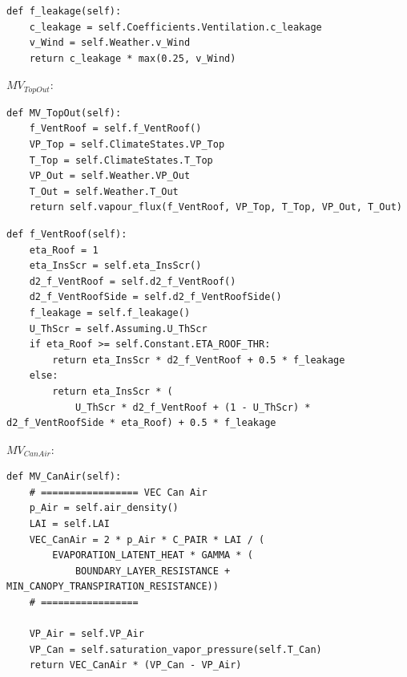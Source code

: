 \documentclass[a4paper]{article}
\numberwithin{equation}{section}
\begin{document}
\begin{mdframed}[leftline=false,rightline=false,backgroundcolor=magenta!10,nobreak=true]
  \begin{verbatim}
def f_leakage(self):
    c_leakage = self.Coefficients.Ventilation.c_leakage
    v_Wind = self.Weather.v_Wind
    return c_leakage * max(0.25, v_Wind)
  \end{verbatim}
\end{mdframed}

\( MV_{TopOut} \):
\begin{mdframed}[leftline=false,rightline=false,backgroundcolor=magenta!10,nobreak=true]
  \begin{verbatim}
def MV_TopOut(self):
    f_VentRoof = self.f_VentRoof()
    VP_Top = self.ClimateStates.VP_Top
    T_Top = self.ClimateStates.T_Top
    VP_Out = self.Weather.VP_Out
    T_Out = self.Weather.T_Out
    return self.vapour_flux(f_VentRoof, VP_Top, T_Top, VP_Out, T_Out)
  \end{verbatim}
\end{mdframed}
\begin{mdframed}[leftline=false,rightline=false,backgroundcolor=magenta!10,nobreak=true]
  \begin{verbatim}
def f_VentRoof(self):
    eta_Roof = 1
    eta_InsScr = self.eta_InsScr()
    d2_f_VentRoof = self.d2_f_VentRoof()
    d2_f_VentRoofSide = self.d2_f_VentRoofSide()
    f_leakage = self.f_leakage()
    U_ThScr = self.Assuming.U_ThScr
    if eta_Roof >= self.Constant.ETA_ROOF_THR:
        return eta_InsScr * d2_f_VentRoof + 0.5 * f_leakage
    else:
        return eta_InsScr * (
            U_ThScr * d2_f_VentRoof + (1 - U_ThScr) * d2_f_VentRoofSide * eta_Roof) + 0.5 * f_leakage
  \end{verbatim}
\end{mdframed}

\( MV_{CanAir} \):
\begin{mdframed}[leftline=false,rightline=false,backgroundcolor=magenta!10,nobreak=true]
  \begin{verbatim}
def MV_CanAir(self):
    # ================= VEC Can Air
    p_Air = self.air_density()
    LAI = self.LAI
    VEC_CanAir = 2 * p_Air * C_PAIR * LAI / (
        EVAPORATION_LATENT_HEAT * GAMMA * (
            BOUNDARY_LAYER_RESISTANCE + MIN_CANOPY_TRANSPIRATION_RESISTANCE))
    # =================

    VP_Air = self.VP_Air
    VP_Can = self.saturation_vapor_pressure(self.T_Can)
    return VEC_CanAir * (VP_Can - VP_Air)
  \end{verbatim}
\end{mdframed}
\end{document}

